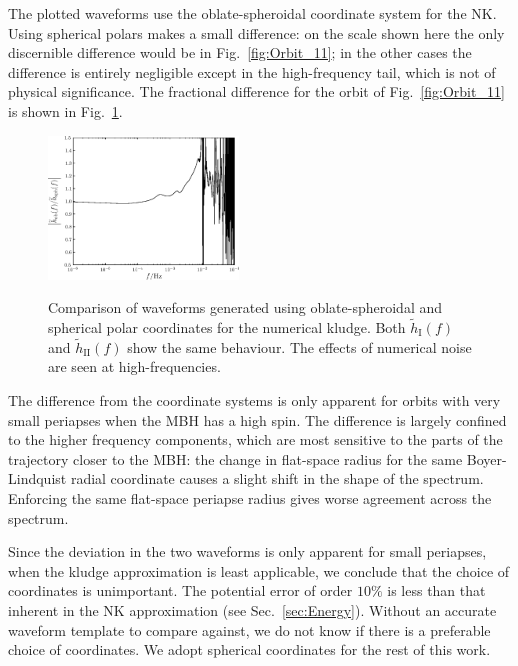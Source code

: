 \documentclass[useAMS,usedcolumn,usegraphicx,usenatbib]{mn2e}
\newcommand{\figref}[1]{Fig.~\ref{fig:#1}}
\newcommand{\secref}[1]{Sec.~\ref{sec:#1}}
\newcommand{\sub}[1]{\ensuremath{_\mathrm{#1}}}
\begin{document}

The plotted waveforms use the oblate-spheroidal coordinate system for the NK. Using spherical polars makes a small difference: on the scale shown here the only discernible difference would be in \figref{Orbit_11}; in the other cases the difference is entirely negligible except in the high-frequency tail, which is not of physical significance. The fractional difference for the orbit of \figref{Orbit_11} is shown in \figref{Oblate_sphere}.
\begin{figure}
\begin{center}
 \includegraphics[width=0.45\textwidth]{Fig_ob_sph_11}
 \label{fig:Oblate_sphere}
 \caption{Comparison of waveforms generated using oblate-spheroidal and spherical polar coordinates for the numerical kludge. Both $\widetilde{h}\sub{I}(f)$ and $\widetilde{h}\sub{II}(f)$ show the same behaviour. The effects of numerical noise are seen at high-frequencies.}
   \end{center}
\end{figure}
The difference from the coordinate systems is only apparent for orbits with very small periapses when the MBH has a high spin. The difference is largely confined to the higher frequency components, which are most sensitive to the parts of the trajectory closer to the MBH: the change in flat-space radius for the same Boyer-Lindquist radial coordinate causes a slight shift in the shape of the spectrum. Enforcing the same flat-space periapse radius gives worse agreement across the spectrum.

Since the deviation in the two waveforms is only apparent for small periapses, when the kludge approximation is least applicable, we conclude that the choice of coordinates is unimportant. The potential error of order $10\%$ is less than that inherent in the NK approximation (see \secref{Energy}). Without an accurate waveform template to compare against, we do not know if there is a preferable choice of coordinates. We adopt spherical coordinates for the rest of this work.
\end{document}
